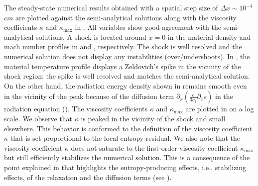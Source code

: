 \documentclass[times,doublespace]{fldauth}%
\begin{document}
The steady-state numerical results obtained with a spatial step size of $\Delta x \sim 10^{-4}$ $cm$ are plotted against the semi-analytical solutions %
along with the viscosity coefficients $\kappa$ and $\kappa_\text{max}$ in . All variables show good agreement with the semi-analytical solutions. A shock is located around $x=0$ in the material density and mach number profiles in  and , respectively. The shock is well resolved and the numerical solution does not display any instabilities (over/undershoots). In , the material temperature profile displays a Zeldovich's spike in the vicinity of the shock region: the spike is well resolved and matches the semi-analytical solution. On the other hand, the radiation energy density shown in  remains smooth even in the vicinity of the peak because of the diffusion term $ \partial_x \left( \frac{c}{3 \sigma_t} \partial_x \epsilon \right)$ in the radiation equation (). The viscosity coefficients $\kappa$ and $\kappa_\text{max}$ are plotted in  on a log scale. We observe that $\kappa$ is peaked in the vicinity of the shock and small elsewhere. This behavior is conformed to the definition of the viscosity coefficient $\kappa$ that is set proportional to the local entropy residual. We also note that the viscosity coefficient $\kappa$ does not saturate to the first-order viscosity coefficient $\kappa_\text{max}$ but still efficiently stabilizes the numerical solution. This is a consequence of the point explained in  that highlights the entropy-producing effects, i.e., stabilizing effects, of the relaxation and the diffusion terms (see ).
\end{document}

